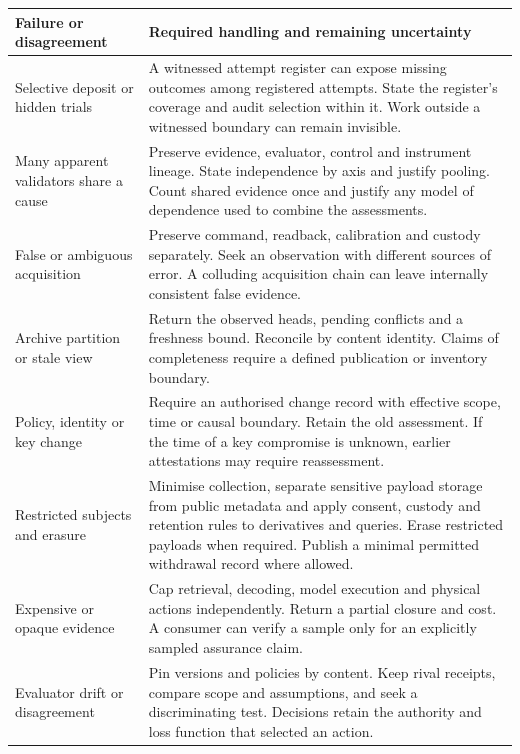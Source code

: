 \documentclass[11pt,a4paper]{article}
\begin{document}
\small
\begin{tabularx}{\linewidth}{@{}L{.25\linewidth}Y@{}}
\toprule
\textbf{Failure or disagreement} & \textbf{Required handling and remaining uncertainty} \\ \midrule
Selective deposit or hidden trials & A witnessed attempt register can expose missing outcomes among registered attempts. State the register's coverage and audit selection within it. Work outside a witnessed boundary can remain invisible. \\
Many apparent validators share a cause & Preserve evidence, evaluator, control and instrument lineage. State independence by axis and justify pooling. Count shared evidence once and justify any model of dependence used to combine the assessments. \\
False or ambiguous acquisition & Preserve command, readback, calibration and custody separately. Seek an observation with different sources of error. A colluding acquisition chain can leave internally consistent false evidence. \\
Archive partition or stale view & Return the observed heads, pending conflicts and a freshness bound. Reconcile by content identity. Claims of completeness require a defined publication or inventory boundary. \\
Policy, identity or key change & Require an authorised change record with effective scope, time or causal boundary. Retain the old assessment. If the time of a key compromise is unknown, earlier attestations may require reassessment. \\
Restricted subjects and erasure & Minimise collection, separate sensitive payload storage from public metadata and apply consent, custody and retention rules to derivatives and queries. Erase restricted payloads when required. Publish a minimal permitted withdrawal record where allowed. \\
Expensive or opaque evidence & Cap retrieval, decoding, model execution and physical actions independently. Return a partial closure and cost. A consumer can verify a sample only for an explicitly sampled assurance claim. \\
Evaluator drift or disagreement & Pin versions and policies by content. Keep rival receipts, compare scope and assumptions, and seek a discriminating test. Decisions retain the authority and loss function that selected an action. \\
\bottomrule
\end{tabularx}
\normalsize
\end{document}
